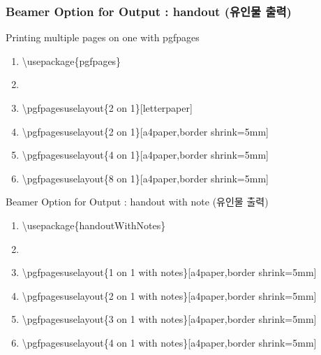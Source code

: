 \documentclass[9pt,blue,xcolor=pdftex,dvipsnames,table,handout,notes]{beamer}
\begin{document}
		\begin{frame}[t]
		\frametitle{Beamer Option for Output : handout (유인물 출력) }

			\begin{block} {Printing multiple pages on one with pgfpages}
			\begin{enumerate}
			\item[]	\textbackslash usepackage\{pgfpages\}
			\item[]	
			\item[]	\textbackslash pgfpagesuselayout\{2 on 1\}[letterpaper]
			\item[]	\textbackslash pgfpagesuselayout\{2 on 1\}[a4paper,border shrink=5mm]
			\item[]	\textbackslash pgfpagesuselayout\{4 on 1\}[a4paper,border shrink=5mm]
			\item[]	\textbackslash pgfpagesuselayout\{8 on 1\}[a4paper,border shrink=5mm]

			\end{enumerate}
			\end{block}



			\begin{block} {Beamer Option for Output : handout with note (유인물 출력) }
			\begin{enumerate}
			\item[]	\textbackslash usepackage\{handoutWithNotes\}
			\item[]	
			\item[]	\textbackslash pgfpagesuselayout\{1 on 1 with notes\}[a4paper,border shrink=5mm]
			\item[]	\textbackslash pgfpagesuselayout\{2 on 1 with notes\}[a4paper,border shrink=5mm]
			\item[]	\textbackslash pgfpagesuselayout\{3 on 1 with notes\}[a4paper,border shrink=5mm]
			\item[]	\textbackslash pgfpagesuselayout\{4 on 1 with notes\}[a4paper,border shrink=5mm]

			\end{enumerate}
			\end{block}
		\end{frame}


\end{document}
